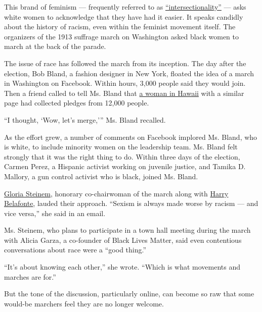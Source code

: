 This brand of feminism --- frequently referred to as
\href{https://www.washingtonpost.com/news/in-theory/wp/2015/09/24/why-intersectionality-cant-wait/?utm_term=.57d0384a6d96}{``intersectionality''}
--- asks white women to acknowledge that they have had it easier. It
speaks candidly about the history of racism, even within the feminist
movement itself. The organizers of the 1913 suffrage march on Washington
asked black women to march at the back of the parade.

The issue of race has followed the march from its inception. The day
after the election, Bob Bland, a fashion designer in New York, floated
the idea of a march in Washington on Facebook. Within hours, 3,000
people said they would join. Then a friend called to tell Ms. Bland that
\href{https://www.washingtonpost.com/national/it-started-with-a-grandmother-in-hawaii-now-the-womens-march-on-washington-is-poised-to-be-the-biggest-inauguration-demonstration/2017/01/03/8af61686-c6e2-11e6-bf4b-2c064d32a4bf_story.html?utm_term=.3aa2a18a7aab}{a
woman in Hawaii} with a similar page had collected pledges from 12,000
people.

``I thought, `Wow, let's merge,''' Ms. Bland recalled.

As the effort grew, a number of comments on Facebook implored Ms. Bland,
who is white, to include minority women on the leadership team. Ms.
Bland felt strongly that it was the right thing to do. Within three days
of the election, Carmen Perez, a Hispanic activist working on juvenile
justice, and Tamika D. Mallory, a gun control activist who is black,
joined Ms. Bland.

\href{https://www.nytimes3xbfgragh.onion/topic/person/gloria-steinem}{Gloria
Steinem}, honorary co-chairwoman of the march along with
\href{https://www.nytimes3xbfgragh.onion/2016/11/07/opinion/campaign-stops/harry-belafonte-what-do-we-have-to-lose-everything.html}{Harry
Belafonte}, lauded their approach. ``Sexism is always made worse by
racism --- and vice versa,'' she said in an email.

Ms. Steinem, who plans to participate in a town hall meeting during the
march with Alicia Garza, a co-founder of Black Lives Matter, said even
contentious conversations about race were a ``good thing.''

``It's about knowing each other,'' she wrote. ``Which is what movements
and marches are for.''

But the tone of the discussion, particularly online, can become so raw
that some would-be marchers feel they are no longer welcome.

